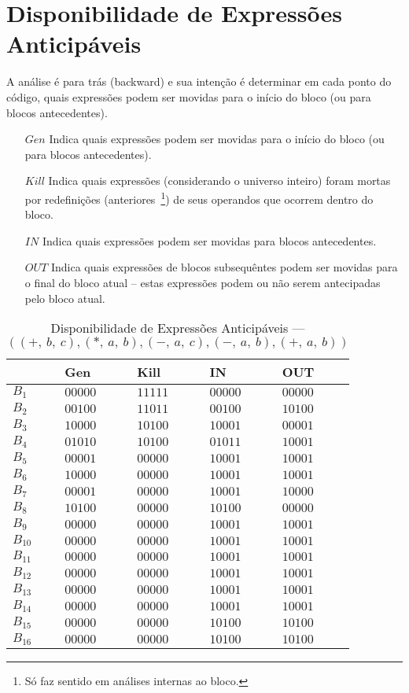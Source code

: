 \section{Disponibilidade de Express\~oes Anticip\'aveis}

A an\'alise \'e para tr\'as (\textsf{backward}) e sua inten\c{c}\~ao \'e determinar em cada ponto do c\'odigo, quais express\~oes podem ser movidas para o in\'icio do bloco (ou para blocos antecedentes).
\begin{itemize}
  \item[$Gen$] Indica quais express\~oes podem ser movidas para o in\'icio do bloco (ou para blocos antecedentes).
  \item[$Kill$] Indica quais express\~oes (considerando o universo inteiro) foram mortas por redefini\c{c}\~oes (anteriores~\footnote{S\'o faz sentido em an\'alises internas ao bloco.}) de seus operandos que ocorrem dentro do bloco.
  \item[$IN$] Indica quais express\~oes podem ser movidas para blocos antecedentes.
  \item[$OUT$] Indica quais express\~oes de blocos subsequ\^entes podem ser movidas para o final do bloco atual -- estas express\~oes podem ou n\~ao serem antecipadas pelo bloco atual.
\end{itemize}

\begin{table}[ht]
\centering
\begin{tabular}{l|l|l|l|l}
	& Gen & Kill & IN & OUT\\
\hline
$B_{1}$ &  $00000$ & $11111$ & $00000$ & $00000$\\
$B_{2}$ &  $00100$ & $11011$ & $00100$ & $10100$\\
$B_{3}$ &  $10000$ & $10100$ & $10001$ & $00001$\\
$B_{4}$ &  $01010$ & $10100$ & $01011$ & $10001$\\
$B_{5}$ &  $00001$ & $00000$ & $10001$ & $10001$\\
$B_{6}$ &  $10000$ & $00000$ & $10001$ & $10001$\\
$B_{7}$ &  $00001$ & $00000$ & $10001$ & $10000$\\
$B_{8}$ &  $10100$ & $00000$ & $10100$ & $00000$\\
$B_{9}$ &  $00000$ & $00000$ & $10001$ & $10001$\\
$B_{10}$ &  $00000$ & $00000$ & $10001$ & $10001$\\
$B_{11}$ &  $00000$ & $00000$ & $10001$ & $10001$\\
$B_{12}$ &  $00000$ & $00000$ & $10001$ & $10001$\\
$B_{13}$ &  $00000$ & $00000$ & $10001$ & $10001$\\
$B_{14}$ &  $00000$ & $00000$ & $10001$ & $10001$\\
$B_{15}$ &  $00000$ & $00000$ & $10100$ & $10100$\\
$B_{16}$ &  $00000$ & $00000$ & $10100$ & $10100$\\
\end{tabular}
\caption{Disponibilidade de Express\~oes Anticip\'aveis --- $((+,\:b,\:c), (*,\:a,\:b), (-,\:a,\:c), (-,\:a,\:b), (+,\:a,\:b))$}
\end{table}

